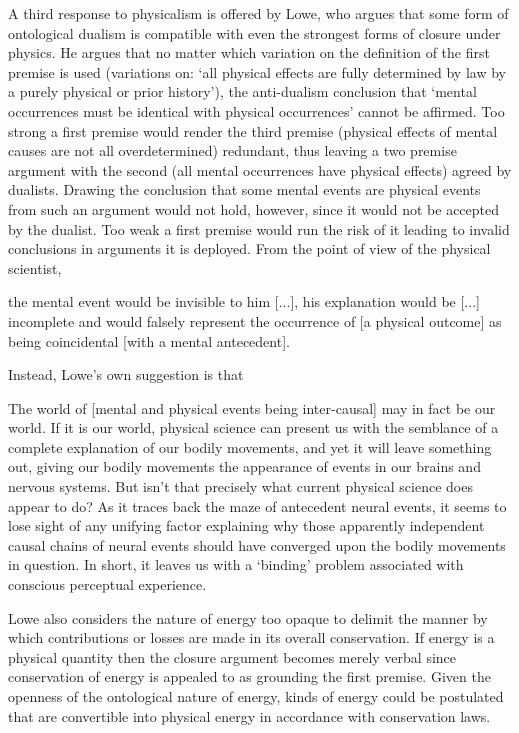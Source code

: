 A third response to physicalism is offered by Lowe, who argues that some form of ontological dualism is compatible with even the strongest forms of closure under physics. He argues that no matter which variation on the definition of the first premise is used (variations on: `all physical effects are fully determined by law by a purely physical or prior history'), the anti-dualism conclusion that `mental occurrences must be identical
with physical occurrences' cannot be affirmed. Too strong a first premise would render the third premise (physical effects of mental causes are not all overdetermined) redundant, thus leaving a two premise argument with the second (all mental occurrences have physical effects) agreed by dualists. Drawing the conclusion that some mental events are physical events from such an argument would not hold, however, since it would not be accepted by the dualist. Too weak a first premise would run the risk of it leading to invalid conclusions in arguments it is deployed. \parencite[][575]{Lowe2000-LOWCCP} From the point of view of the physical scientist,
\begin{quoting}
the mental event would be invisible to him [...], his explanation would be [...] incomplete and would falsely represent the occurrence of [a physical outcome] as being coincidental [with a mental antecedent]. \parencite[][581]{Lowe2000-LOWCCP}
\end{quoting}
Instead, Lowe's own suggestion is that
\begin{quoting}
The world of [mental and physical events being inter-causal] may in fact be our world. If it is our world, physical science can present us with the semblance of a complete explanation of our bodily movements, and yet it will leave something out, giving our bodily movements the appearance of events in our brains and nervous systems. But isn't that precisely what current physical science does appear to do? As it traces back the maze of antecedent neural events, it seems to lose sight of any unifying factor explaining why those apparently independent causal chains of neural events should have converged upon the bodily movements in question. In short, it leaves us with a `binding' problem associated with conscious perceptual experience. \parencite[][581]{Lowe2000-LOWCCP}
\end{quoting}

Lowe also considers the nature of energy too opaque to delimit the manner by which contributions or losses are made in its overall conservation. If energy is a physical quantity then the closure argument becomes merely verbal since conservation of energy is appealed to as grounding the first premise. Given the openness of the ontological nature of energy, kinds of energy could be postulated that are convertible into physical energy in accordance with conservation laws. \parencite[][571]{Lowe2000-LOWCCP}

